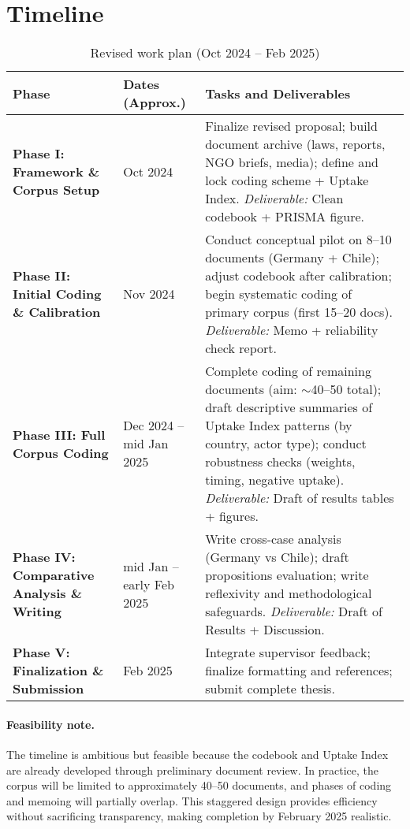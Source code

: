 
\section*{Timeline}

\begin{table}[h!]
\centering
\caption{Revised work plan (Oct 2024 -- Feb 2025)}
\label{tab:timeline}
\begin{tabular}{@{}p{3cm}p{3.5cm}p{8cm}@{}}
\toprule
\textbf{Phase} & \textbf{Dates (Approx.)} & \textbf{Tasks and Deliverables} \\ \midrule

\textbf{Phase I: Framework \& Corpus Setup} & Oct 2024 & 
Finalize revised proposal; build document archive (laws, reports, NGO briefs, media); define and lock coding scheme + Uptake Index. 
\textit{Deliverable:} Clean codebook + PRISMA figure. \\

\textbf{Phase II: Initial Coding \& Calibration} & Nov 2024 & 
Conduct conceptual pilot on 8--10 documents (Germany + Chile); adjust codebook after calibration; begin systematic coding of primary corpus (first 15--20 docs). 
\textit{Deliverable:} Memo + reliability check report. \\

\textbf{Phase III: Full Corpus Coding} & Dec 2024 -- mid Jan 2025 & 
Complete coding of remaining documents (aim: $\sim$40--50 total); draft descriptive summaries of Uptake Index patterns (by country, actor type); conduct robustness checks (weights, timing, negative uptake). 
\textit{Deliverable:} Draft of results tables + figures. \\

\textbf{Phase IV: Comparative Analysis \& Writing} & mid Jan -- early Feb 2025 & 
Write cross-case analysis (Germany vs Chile); draft propositions evaluation; write reflexivity and methodological safeguards. 
\textit{Deliverable:} Draft of Results + Discussion. \\

\textbf{Phase V: Finalization \& Submission} & Feb 2025 & 
Integrate supervisor feedback; finalize formatting and references; submit complete thesis. \\

\bottomrule
\end{tabular}
\end{table}

\paragraph{Feasibility note.}
The timeline is ambitious but feasible because the codebook and Uptake Index are already developed through preliminary document review. 
In practice, the corpus will be limited to approximately 40--50 documents, and phases of coding and memoing will partially overlap. 
This staggered design provides efficiency without sacrificing transparency, making completion by February 2025 realistic.